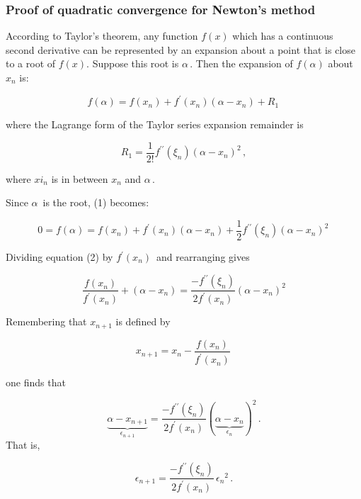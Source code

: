 \documentclass[10pt]{beamer}
\begin{document}
\begin{frame}[allowframebreaks]

\frametitle{Proof of quadratic convergence for Newton's method}

According to Taylor's theorem, any function $f(x)$ which has a
continuous second derivative can be represented by an expansion about
a point that is close to a root of $f(x)$. Suppose this root is $\alpha
\,$. Then the expansion of $f(\alpha)$ about $x_n$ is:

\begin{equation*}
    f(\alpha) = f(x_n) + f^\prime(x_n)(\alpha - x_n) + R_1 \,
  \end{equation*}

where the Lagrange form of the Taylor series expansion remainder is

\begin{equation*}
    R_1 = \frac{1}{2!}f^{\prime\prime}(\xi_n)(\alpha - x_n)^{2} \,,
  \end{equation*}

where $xi_n$ is in between $x_n$ and $\alpha \,$.

Since $\alpha \,$ is the root, (1) becomes:

\begin{equation*}
    0 = f(\alpha) = f(x_n) + f^\prime(x_n)(\alpha - x_n) + \frac{1}{2}f^{\prime\prime}(\xi_n)(\alpha - x_n)^{2} \,
  \end{equation*}

Dividing equation (2) by $f^\prime(x_n)\,$ and rearranging gives

\begin{equation*}
    \frac {f(x_n)}{f^\prime(x_n)}+\left(\alpha-x_n\right) = \frac {- f^{\prime\prime} (\xi_n)}{2 f^\prime(x_n)}\left(\alpha-x_n\right)^2
  \end{equation*}

Remembering that $x_{n+1}$ is defined by

\begin{equation*}
  x_{n+1} = x_{n} - \frac {f(x_n)}{f^\prime(x_n)} \,
\end{equation*}

one finds that

\begin{equation*}
    \underbrace{\alpha - x_{n+1}}_{\epsilon_{n+1}} = \frac {- f^{\prime\prime} (\xi_n)}{2 f^\prime(x_n)} (\underbrace{\alpha - x_n}_{\epsilon_{n}})^2 \,.
  \end{equation*}
That is,

\begin{equation*}
    \epsilon_{n+1} = \frac {- f^{\prime\prime} (\xi_n)}{2 f^\prime(x_n)} \, {\epsilon_n}^2 \,.
  \end{equation*}


\end{frame}
\end{document}
